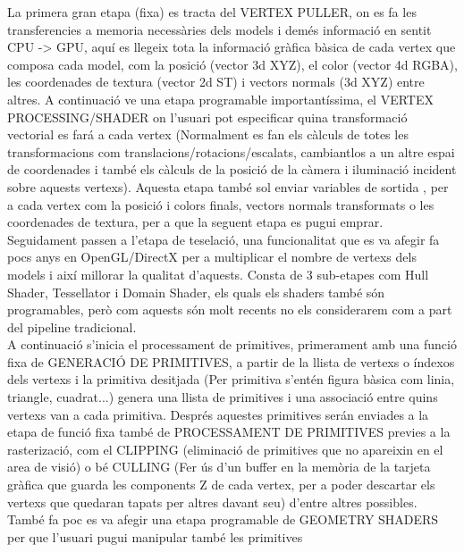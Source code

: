 \documentclass[12pt]{article}
\begin{document}
La primera gran etapa (fixa) es tracta del VERTEX PULLER, on es fa les transferencies a memoria necessàries dels models i demés informació en sentit CPU -> GPU, aquí es llegeix tota la informació gràfica 
bàsica de cada vertex que composa cada model, com la posició (vector 3d XYZ), el color (vector 4d RGBA), les coordenades de textura (vector 2d ST) i vectors normals (3d XYZ) entre altres. A continuació 
ve una etapa programable importantíssima, el VERTEX PROCESSING/SHADER on l'usuari pot especificar quina transformació vectorial es fará a cada vertex (Normalment es fan els càlculs de totes les transformacions
com translacions/rotacions/escalats, cambiantlos a un altre espai de coordenades i també els càlculs de la posició de la càmera i iluminació incident sobre aquests vertexs). Aquesta etapa també sol enviar 
variables de sortida , per a cada vertex com la posició i colors finals, vectors normals transformats o les coordenades de textura, per a que la seguent etapa es pugui emprar.
\\

Seguidament passen a l'etapa de teselació, una funcionalitat que es va afegir fa pocs anys en OpenGL/DirectX per a multiplicar el nombre de vertexs dels models i així millorar la qualitat d'aquests. 
Consta de 3 sub-etapes com Hull Shader, Tessellator i Domain Shader, els quals els shaders també són programables, però com aquests són molt recents no els considerarem com a part del pipeline tradicional.
\\

A continuació s'inicia el processament de primitives, primerament amb una funció fixa de GENERACIÓ DE PRIMITIVES, a partir de la llista de vertexs o índexos dels vertexs i la primitiva desitjada
(Per primitiva s'entén figura bàsica com linia, triangle, cuadrat...) genera una llista de primitives i una associació entre quins vertexs van a cada primitiva. Després aquestes primitives serán 
enviades a la etapa de funció fixa també de PROCESSAMENT DE PRIMITIVES previes a la rasterizació, com el CLIPPING (eliminació de primitives que no apareixin en el area de visió) o bé CULLING
(Fer ús d'un buffer en la memòria de la tarjeta gràfica que guarda les components Z de cada vertex, per a poder descartar els vertexs que quedaran tapats per altres davant seu) d'entre altres possibles.
També fa poc es va afegir una etapa programable de GEOMETRY SHADERS per que l'usuari pugui manipular també les primitives
\\
\end{document}
